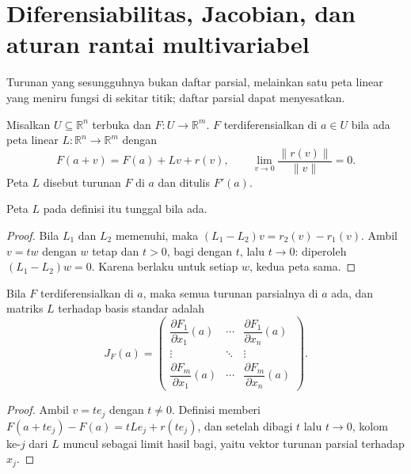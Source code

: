 \section{Diferensiabilitas, Jacobian, dan aturan rantai multivariabel}

Turunan yang sesungguhnya bukan daftar parsial, melainkan satu peta linear yang meniru fungsi
di sekitar titik; daftar parsial dapat menyesatkan.

\begin{definisi}[Diferensiabilitas]
Misalkan $U\subseteq\mathbb{R}^{n}$ terbuka dan $F\colon U\to\mathbb{R}^{m}$. $F$
terdiferensialkan di $a\in U$ bila ada peta linear $L\colon\mathbb{R}^{n}\to\mathbb{R}^{m}$
dengan
\[
  F(a+v)=F(a)+Lv+r(v),
  \qquad
  \lim_{v\to0}\frac{\|r(v)\|}{\|v\|}=0 .
\]
Peta $L$ disebut turunan $F$ di $a$ dan ditulis $F'(a)$.
\end{definisi}

\begin{proposisi}
Peta $L$ pada definisi itu tunggal bila ada.
\end{proposisi}

\begin{proof}
Bila $L_{1}$ dan $L_{2}$ memenuhi, maka $(L_{1}-L_{2})v=r_{2}(v)-r_{1}(v)$. Ambil
$v=tw$ dengan $w$ tetap dan $t>0$, bagi dengan $t$, lalu $t\to0$: diperoleh
$(L_{1}-L_{2})w=0$. Karena berlaku untuk setiap $w$, kedua peta sama.
\end{proof}

\begin{teorema}
Bila $F$ terdiferensialkan di $a$, maka semua turunan parsialnya di $a$ ada, dan matriks
$L$ terhadap basis standar adalah
\[
  J_{F}(a)=\begin{pmatrix}
    \dfrac{\partial F_{1}}{\partial x_{1}}(a) & \cdots &
    \dfrac{\partial F_{1}}{\partial x_{n}}(a)\\
    \vdots & \ddots & \vdots\\
    \dfrac{\partial F_{m}}{\partial x_{1}}(a) & \cdots &
    \dfrac{\partial F_{m}}{\partial x_{n}}(a)
  \end{pmatrix}.
\]
\end{teorema}

\begin{proof}
Ambil $v=te_{j}$ dengan $t\neq0$. Definisi memberi
$F(a+te_{j})-F(a)=tLe_{j}+r(te_{j})$, dan setelah dibagi $t$ lalu $t\to0$, kolom ke-$j$
dari $L$ muncul sebagai limit hasil bagi, yaitu vektor turunan parsial terhadap $x_{j}$.
\end{proof}

